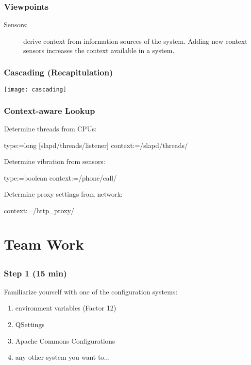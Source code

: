 \begin{frame}
	\frametitle{Viewpoints}
	\begin{description}
	\item[Sensors:] derive context from information sources of the system.
	Adding new context sensors increases the context available in a system.
	\end{description}
\end{frame}

\begin{frame}
	\frametitle{Cascading (Recapitulation)}
	\texttt{[image: cascading]}
\end{frame}

\begin{frame}[fragile]
	\frametitle{Context-aware Lookup}

	Determine threads from CPUs:

	\begin{code}[gobble=4]
	[cpu]
	  type:=long
	[slapd/threads/listener]
	  context:=/slapd/threads/%
	\end{code}

	Determine vibration from sensors:

	\begin{code}
	  type:=boolean
	  context:=/phone/call/%
	\end{code}

	Determine proxy settings from network:

	\begin{code}
	  context:=/http_proxy/%
	\end{code}
\end{frame}


\section{Team Work}

\subsection{}

\begin{frame}
	\frametitle{Step 1 (15 min)}

	Familiarize yourself with one of the configuration systems:

	\begin{enumerate}
	\item environment variables (Factor 12)
	\item QSettings
	\item Apache Commons Configurations
	\item any other system you want to...
	\end{enumerate}
\end{frame}

